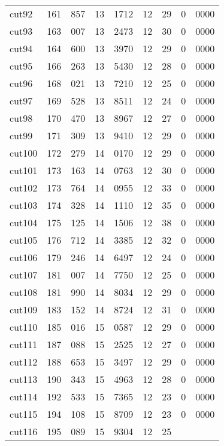 \documentclass[11pt]{article}
\begin{document}
\begin{center}
\begin{tabular}{lr@{.}lr@{.}lr@{.}lr@{.}l}
cut92 &
  161&857 &
    13&1712 &
      12&29 &
        0&0000 \\
cut93 &
  163&007 &
    13&2473 &
      12&30 &
        0&0000 \\
cut94 &
  164&600 &
    13&3970 &
      12&29 &
        0&0000 \\
cut95 &
  166&263 &
    13&5430 &
      12&28 &
        0&0000 \\
cut96 &
  168&021 &
    13&7210 &
      12&25 &
        0&0000 \\
cut97 &
  169&528 &
    13&8511 &
      12&24 &
        0&0000 \\
cut98 &
  170&470 &
    13&8967 &
      12&27 &
        0&0000 \\
cut99 &
  171&309 &
    13&9410 &
      12&29 &
        0&0000 \\
cut100 &
  172&279 &
    14&0170 &
      12&29 &
        0&0000 \\
cut101 &
  173&163 &
    14&0763 &
      12&30 &
        0&0000 \\
cut102 &
  173&764 &
    14&0955 &
      12&33 &
        0&0000 \\
cut103 &
  174&328 &
    14&1110 &
      12&35 &
        0&0000 \\
cut104 &
  175&125 &
    14&1506 &
      12&38 &
        0&0000 \\
cut105 &
  176&712 &
    14&3385 &
      12&32 &
        0&0000 \\
cut106 &
  179&246 &
    14&6497 &
      12&24 &
        0&0000 \\
cut107 &
  181&007 &
    14&7750 &
      12&25 &
        0&0000 \\
cut108 &
  181&990 &
    14&8034 &
      12&29 &
        0&0000 \\
cut109 &
  183&152 &
    14&8724 &
      12&31 &
        0&0000 \\
cut110 &
  185&016 &
    15&0587 &
      12&29 &
        0&0000 \\
cut111 &
  187&088 &
    15&2525 &
      12&27 &
        0&0000 \\
cut112 &
  188&653 &
    15&3497 &
      12&29 &
        0&0000 \\
cut113 &
  190&343 &
    15&4963 &
      12&28 &
        0&0000 \\
cut114 &
  192&533 &
    15&7365 &
      12&23 &
        0&0000 \\
cut115 &
  194&108 &
    15&8709 &
      12&23 &
        0&0000 \\
cut116 &
  195&089 &
    15&9304 &
      12&25 &

\end{tabular}
\end{center}
\end{document}
